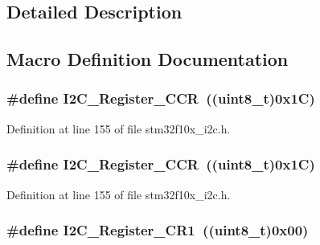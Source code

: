 \subsection{Detailed Description}


\subsection{Macro Definition Documentation}
\subsubsection[{\texorpdfstring{I2\+C\+\_\+\+Register\+\_\+\+C\+CR}{I2C_Register_CCR}}]{\setlength{\rightskip}{0pt plus 5cm}\#define I2\+C\+\_\+\+Register\+\_\+\+C\+CR~(({\bf uint8\+\_\+t})0x1\+C)}\hypertarget{group___i2_c__registers_ga7a0de765650408f3915b54141f052c5b}{}\label{group___i2_c__registers_ga7a0de765650408f3915b54141f052c5b}


Definition at line 155 of file stm32f10x\+\_\+i2c.\+h.

\subsubsection[{\texorpdfstring{I2\+C\+\_\+\+Register\+\_\+\+C\+CR}{I2C_Register_CCR}}]{\setlength{\rightskip}{0pt plus 5cm}\#define I2\+C\+\_\+\+Register\+\_\+\+C\+CR~(({\bf uint8\+\_\+t})0x1\+C)}\hypertarget{group___i2_c__registers_ga7a0de765650408f3915b54141f052c5b}{}\label{group___i2_c__registers_ga7a0de765650408f3915b54141f052c5b}


Definition at line 155 of file stm32f10x\+\_\+i2c.\+h.

\subsubsection[{\texorpdfstring{I2\+C\+\_\+\+Register\+\_\+\+C\+R1}{I2C_Register_CR1}}]{\setlength{\rightskip}{0pt plus 5cm}\#define I2\+C\+\_\+\+Register\+\_\+\+C\+R1~(({\bf uint8\+\_\+t})0x00)}\hypertarget{group___i2_c__registers_ga4b9e7934e490c3540e50cf2f1d0a7688}{}\label{group___i2_c__registers_ga4b9e7934e490c3540e50cf2f1d0a7688}


